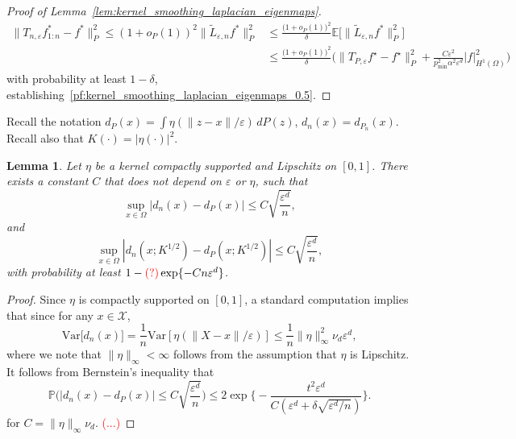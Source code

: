 \documentclass{article}
\newcommand{\Var}{\mathrm{Var}}
\newcommand{\1}{\mathbf{1}}
\newcommand{\mc}[1]{\mathcal{#1}}
\newcommand{\Pbb}{\mathbb{P}}
\newcommand{\wt}[1]{\widetilde{#1}}
\newtheorem{lemma}{Lemma}
\theoremstyle{definition}
\theoremstyle{remark}
\begin{document}
\begin{proof}[Proof of Lemma~\ref{lem:kernel_smoothing_laplacian_eigenmaps}]
	\begin{align*}
	\|T_{n,\varepsilon}f^{\ast}_{1:n} - f^{\ast}\|_P^2 \leq (1 + o_P(1))^2 \|\wt{L}_{\varepsilon,n}f^{\ast}\|_P^2 & \leq \frac{\bigl(1 + o_P(1)\bigr)^2}{\delta} \mathbb{E}\bigl[\|\wt{L}_{\varepsilon,n}f^{\ast}\|_P^2\bigr] \\ 
	& \leq \frac{\bigl(1 + o_P(1)\bigr)^2}{\delta}\biggl(\|T_{P,\varepsilon}f^{\star} - f^{\star}\|_{P}^2 + \frac{C\varepsilon^2}{p_{\min}^2 \alpha^2 \varepsilon^{d}} |f|_{H^1(\Omega)}^2\biggr)
	\end{align*}
	with probability at least $1 - \delta$, establishing~\eqref{pf:kernel_smoothing_laplacian_eigenmaps_0.5}.
\end{proof}

Recall the notation $d_P(x) = \int \eta(\|z - x\|/\varepsilon) \,dP(z)$, $d_n(x) = d_{P_n}(x)$. Recall also that $K(\cdot) = |\eta(\cdot)|^2$. 
\begin{lemma}
	\label{lem:measure_of_ball_estimate}
	Let $\eta$ be a kernel compactly supported and Lipschitz on $[0,1]$. There exists a constant $C$ that does not depend on $\varepsilon$ or $\eta$, such that
	\begin{equation*}
	\sup_{x \in \Omega}|d_n(x) - d_P(x)| \leq C \sqrt{\frac{\varepsilon^d}{n}},
	\end{equation*}
	and
	\begin{equation*}
	\sup_{x \in \Omega}|d_n(x;K^{1/2}) - d_P(x;K^{1/2})| \leq C \sqrt{\frac{\varepsilon^d}{n}},
	\end{equation*}
	with probability at least $1 - \textcolor{red}{(?)}\exp\{-Cn\varepsilon^d\}$. 
\end{lemma}

\begin{proof}
	Since $\eta$ is compactly supported on $[0,1]$, a standard computation implies that since for any $x \in \mc{X}$,
	\begin{equation*}
	\Var\bigl[d_n(x)\bigl] = \frac{1}{n} \Var[\eta(\|X - x\|/\varepsilon)] \leq \frac{1}{n}\|\eta\|_{\infty}^2 \nu_d \varepsilon^d,
	\end{equation*}
	where we note that $\|\eta\|_{\infty} < \infty$ follows from the assumption that $\eta$ is Lipschitz. It follows from Bernstein's inequality that 
	\begin{equation*}
	\Pbb\biggl(|d_n(x) - d_P(x)| \leq C \sqrt{\frac{\varepsilon^d}{n}} \biggr) \leq 2\exp\biggl\{-\frac{t^2 \varepsilon^d}{C(\varepsilon^d + \delta \sqrt{\varepsilon^d/n})}\biggr\}.
	\end{equation*}
	for $C = \|\eta\|_{\infty} \nu_d$. \textcolor{red}{(...)}
\end{proof}
\end{document}
